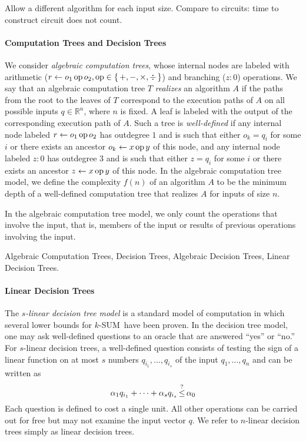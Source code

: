 Allow a different algorithm for each input size.
Compare to circuits: time to construct circuit does not count.

\paragraph{Computation Trees and Decision Trees}
We consider \emph{algebraic computation trees}, whose internal nodes
are labeled with arithmetic (\(r \gets o_1 \operatorname{op} o_2, \operatorname{op} \in
\{\,+,-,\times,\div\,\}\)) and branching (\(z : 0\)) operations. We say that an
algebraic computation tree $T$ \emph{realizes} an algorithm $A$ if the paths
from the root to the leaves of $T$ correspond to the execution paths of \(A\)
on all possible inputs \(q \in \mathbb{R}^n\), where \(n\) is fixed. A leaf is
labeled with the output of the corresponding execution path of \(A\). Such a
tree is \emph{well-defined} if any internal node labeled \(r \gets o_1 \operatorname{op}
o_2\) has outdegree \(1\) and is such that either \(o_k = q_i\) for some \(i\)
or there exists an ancestor \(o_k \gets x \operatorname{op} y\) of this node, and any
internal node labeled \(z : 0\) has outdegree \(3\) and is such that either \(z
= q_i\) for some \(i\) or there exists an ancestor \(z \gets x \operatorname{op} y\) of this
node. In the algebraic computation tree model, we define the complexity
\(f(n)\) of an algorithm $A$ to be the minimum depth of a well-defined
computation tree that realizes $A$ for inputs of size $n$.

In the algebraic computation tree model, we only count the operations that
involve the input, that is, members of the input or results of previous
operations involving the input.

Algebraic Computation Trees,
Decision Trees,
Algebraic Decision Trees,
Linear Decision Trees.

\paragraph{Linear Decision Trees}

The \emph{\(s\)-linear decision tree model} is a standard model of computation
in which several lower bounds for \(k\)-SUM\ have been proven. In the decision tree
model, one may ask well-defined questions to an oracle that are answered
``yes'' or ``no.'' For $s$-linear decision trees, a well-defined question consists
of testing the sign of a linear function on at most \(s\) numbers \(q_{i_1},\ldots,q_{i_s}\) of the
input \(q_1,\ldots,q_n\) and can be written as
%
\begin{displaymath}
	\alpha_1 q_{i_1} + \cdots + \alpha_s q_{i_s} \mathop{\le}^{?} \alpha_0
\end{displaymath}
%
Each question is defined to cost a single unit. All other operations can be
carried out for free but may not examine the input vector $q$. We refer to
$n$-linear decision trees simply as linear decision trees.


